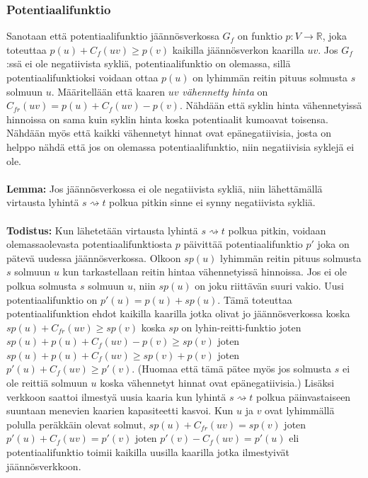 \documentclass[a4paper, 11pt]{article}
\begin{document}
\subsubsection*{Potentiaalifunktio}
Sanotaan että potentiaalifunktio jäännösverkossa $G_f$ on funktio 
$p: V \rightarrow \mathbb{R}$, joka toteuttaa
$p(u) + C_f(uv) \ge p(v)$ kaikilla jäännösverkon kaarilla $uv$. Jos $G_f$:ssä ei ole 
negatiivista sykliä, potentiaalifunktio
on olemassa, sillä potentiaalifunktioksi voidaan ottaa $p(u)$ on lyhimmän reitin pituus
solmusta $s$ solmuun $u$.
Määritellään että kaaren $uv$ \textit{vähennetty hinta} on $C_{fr}(uv) = p(u) + C_f(uv) - p(v)$.
Nähdään että syklin hinta vähennetyissä hinnoissa on sama kuin syklin hinta koska potentiaalit
kumoavat toisensa. Nähdään myös
että kaikki vähennetyt hinnat ovat epänegatiivisia, josta on helppo nähdä että jos on
olemassa potentiaalifunktio, niin negatiivisia syklejä ei ole.\\\\
\noindent
\textbf{Lemma:} Jos jäännösverkossa ei ole negatiivista sykliä, niin lähettämällä virtausta
lyhintä $s \rightsquigarrow t$ polkua pitkin sinne ei synny negatiivista sykliä.\\\\
\noindent
\textbf{Todistus:} Kun lähetetään virtausta lyhintä $s \rightsquigarrow t$ polkua pitkin, voidaan
olemassaolevasta potentiaalifunktiosta $p$ 
päivittää potentiaalifunktio $p'$ joka on pätevä uudessa jäännösverkossa.
Olkoon $sp(u)$ lyhimmän reitin pituus
solmusta $s$ solmuun $u$ kun tarkastellaan reitin hintaa vähennetyissä hinnoissa.
Jos ei ole polkua solmusta $s$ solmuun $u$, niin $sp(u)$ on joku riittävän suuri vakio.
Uusi potentiaalifunktio on $p'(u) = p(u) + sp(u)$. Tämä toteuttaa potentiaalifunktion
ehdot kaikilla kaarilla jotka olivat jo jäännösverkossa koska $sp(u) + C_{fr}(uv) \ge sp(v)$
koska $sp$ on lyhin-reitti-funktio joten $sp(u) + p(u) + C_f(uv) - p(v) \ge sp(v)$
joten $sp(u) + p(u) + C_f(uv) \ge sp(v) + p(v)$ joten $p'(u) + C_f(uv) \ge p'(v)$.
(Huomaa että tämä pätee myös jos solmusta $s$ ei ole reittiä solmuun $u$ koska vähennetyt
hinnat ovat epänegatiivisia.)
Lisäksi verkkoon saattoi ilmestyä uusia kaaria kun lyhintä $s \rightsquigarrow t$ polkua
päinvastaiseen suuntaan menevien kaarien kapasiteetti kasvoi. Kun $u$ ja $v$ ovat
lyhimmällä polulla peräkkäin olevat solmut, $sp(u) + C_{fr}(uv) = sp(v)$ joten
$p'(u) + C_f(uv) = p'(v)$ joten $p'(v) - C_f(uv) = p'(u)$ eli potentiaalifunktio
toimii kaikilla uusilla kaarilla jotka ilmestyivät jäännösverkkoon.
\end{document}

